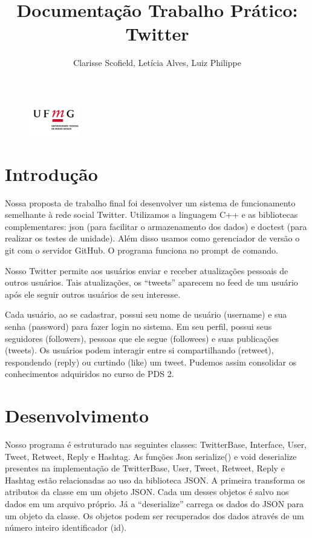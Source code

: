 \documentclass[a4paper]{article}
\title{Documentação Trabalho Prático: Twitter}
\author{Clarisse Scofield,
        Letícia Alves,
        Luiz Philippe}
\begin{document}
\begin{figure}
\includegraphics[width=0.2\textwidth]{logo-ufmg2.png}
\end{figure}

\lstset{escapechar=@,style=customc}
\maketitle



\section{Introdução}


Nossa proposta de trabalho final foi desenvolver um sistema de funcionamento semelhante à rede social Twitter. Utilizamos a linguagem C++ e as bibliotecas complementares: json (para facilitar o armazenamento dos dados) e doctest (para realizar os testes de unidade). Além disso usamos como gerenciador de versão o git com o servidor GitHub. O programa funciona no prompt de comando.

Nosso Twitter permite aos usuários enviar e receber atualizações pessoais de outros usuários. Tais atualizações, os “tweets” aparecem no feed de um usuário após ele seguir outros usuários de seu interesse.

Cada usuário, ao se cadastrar, possui seu nome de usuário (username) e sua senha (password) para fazer login no sistema. Em seu perfil, possui seus seguidores (followers), pessoas que ele segue (followees) e suas publicações (tweets). Os usuários podem interagir entre si compartilhando (retweet), respondendo (reply) ou curtindo (like) um tweet.
Pudemos assim consolidar os conhecimentos adquiridos no curso de PDS 2.

\section{Desenvolvimento}

Nosso programa é estruturado nas seguintes classes: TwitterBase, Interface, User, Tweet, Retweet, Reply e Hashtag. As funções Json serialize() e void deserialize presentes na implementação de TwitterBase, User, Tweet, Retweet, Reply e Hashtag estão relacionadas ao uso da biblioteca JSON. A primeira transforma os atributos da classe em um objeto JSON. Cada um desses objetos é salvo nos dados em um arquivo próprio. Já a “deserialize” carrega os dados do JSON para um objeto da classe. Os objetos podem ser recuperados dos dados através de um número inteiro identificador (id).
\end{document}
